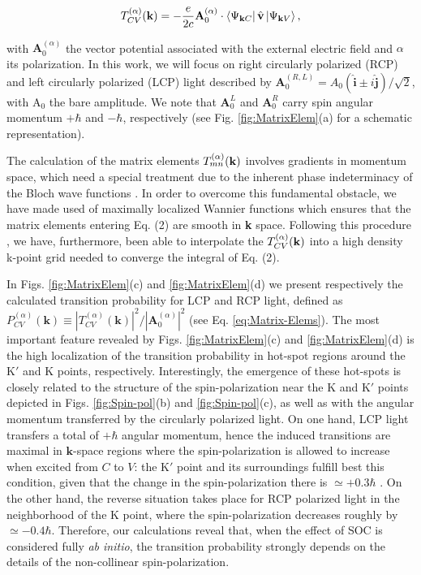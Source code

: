 \documentclass[aps,prb,showpacs,preprintnumbers,twocolumn,amsmath,amssymb]{revtex4-1}
\begin{document}
\begin{equation}
\label{eq:Matrix-Elems}
T^{(\alpha)}_{C V}(\textbf{k})=-\frac{e}{2c}\textbf{A}^{(\alpha)}_{0}\cdot\bra{\Psi_{\textbf{k} C}}\hat{\textbf{v}}
\ket{\Psi_{{\bf k}V}},
\end{equation}

with $\textbf{A}^{(\alpha)}_{0}$ the vector potential associated with the external electric field and $\alpha$ its polarization. In this work, we will focus on right circularly polarized (RCP) and left circularly polarized (LCP) light described by $\textbf{A}_{0}^{(R,L)}=A_{0}(\hat{\textbf{i}}\pm i\hat{\textbf{j}})/\sqrt{2}$, with A$_{0}$ the bare amplitude. We note that $\textbf{A}_{0}^{L}$ and $\textbf{A}_{0}^{R}$ carry spin angular momentum $+\hbar$ and $-\hbar$, respectively (see Fig. \ref{fig:MatrixElem}(a) for a schematic representation). 

The calculation of the matrix elements $T^{(\alpha)}_{mn} (\bf k)$ involves gradients in momentum space, which need a special treatment due to the inherent phase indeterminacy of the Bloch wave functions \cite{Blount1962,Wang2006}. In order to overcome this fundamental obstacle, we have made used of maximally localized Wannier functions \cite{Marzari1997,Souza2001,Mostofi2008} which ensures that the matrix elements entering Eq. (2) are smooth in \textbf{k} space. Following this procedure \cite{Ibanez-Azpiroz2012,Ibanez-Azpiroz2013}, we have, furthermore, been able to interpolate the  $T^{(\alpha)}_{CV}(\bf k)$ 
into a high density k-point grid needed to converge the integral of Eq. 
(2).

In Figs. \ref{fig:MatrixElem}(c) and \ref{fig:MatrixElem}(d) we present respectively the calculated transition probability for LCP and RCP light, defined as $ P^{(\alpha)}_{CV} (\textbf{k})\equiv |T_{CV  }^{(\alpha)}(\textbf{k})|^{2}/|\textbf{A}^{(\alpha)}_{0}|^{2}$  (see Eq. \ref{eq:Matrix-Elems}). 
The most important feature revealed by Figs. \ref{fig:MatrixElem}(c) and \ref{fig:MatrixElem}(d) is the high localization of the transition probability in hot-spot regions around the K$'$ and K points, respectively. Interestingly, the emergence of these hot-spots is closely related to the structure of the spin-polarization near the K and K$'$ points depicted in Figs. \ref{fig:Spin-pol}(b) and \ref{fig:Spin-pol}(c), as well as with the angular momentum transferred by the circularly polarized light. On one hand, LCP light transfers a total of $+\hbar$ angular momentum, hence the induced transitions are maximal in $\textbf{k}$-space regions where the spin-polarization is allowed to increase when excited from $C$ to $V$: the K$'$ point and its surroundings fulfill best this condition, given that the change in the spin-polarization there is  $\simeq +0.3\hbar $ . On the other hand, the reverse situation takes place for RCP polarized light in the neighborhood of the K point, where the spin-polarization decreases roughly by $\simeq -0.4\hbar$. Therefore, our calculations reveal that, when the effect of SOC is considered fully \textit{ab initio}, the transition probability strongly depends on the details of the non-collinear spin-polarization.
\end{document}
